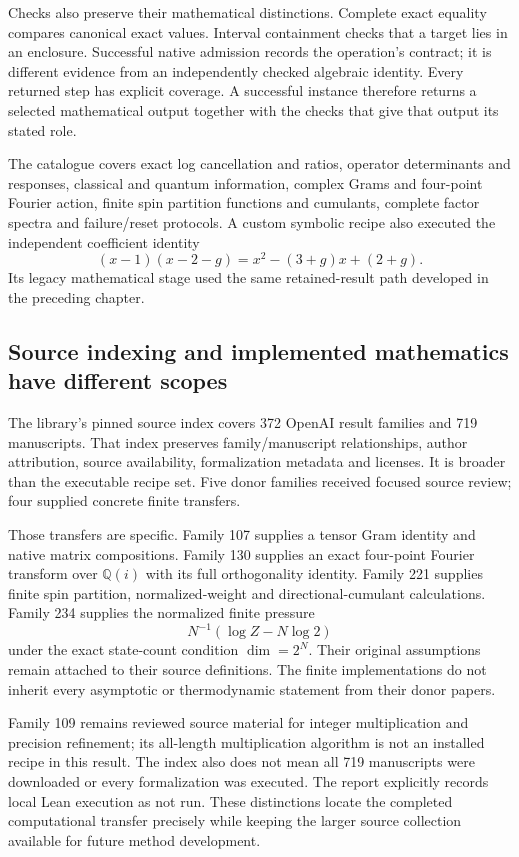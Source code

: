 Checks also preserve their mathematical distinctions. Complete exact equality compares canonical exact values. Interval containment checks that a target lies in an enclosure. Successful native admission records the operation's contract; it is different evidence from an independently checked algebraic identity. Every returned step has explicit coverage. A successful instance therefore returns a selected mathematical output together with the checks that give that output its stated role.

The catalogue covers exact log cancellation and ratios, operator determinants and responses, classical and quantum information, complex Grams and four-point Fourier action, finite spin partition functions and cumulants, complete factor spectra and failure/reset protocols. A custom symbolic recipe also executed the independent coefficient identity
\[
 (x-1)(x-2-g)
 =x^2-(3+g)x+(2+g).
\]
Its legacy mathematical stage used the same retained-result path developed in the preceding chapter.

\subsection{Source indexing and implemented mathematics have different scopes}
\label{v3-runtime-donors}

The library's pinned source index covers 372 OpenAI result families and 719 manuscripts. That index preserves family/manuscript relationships, author attribution, source availability, formalization metadata and licenses. It is broader than the executable recipe set. Five donor families received focused source review; four supplied concrete finite transfers.

Those transfers are specific. Family 107 supplies a tensor Gram identity and native matrix compositions. Family 130 supplies an exact four-point Fourier transform over $\mathbb Q(i)$ with its full orthogonality identity. Family 221 supplies finite spin partition, normalized-weight and directional-cumulant calculations. Family 234 supplies the normalized finite pressure
\[
 N^{-1}(\log Z-N\log2)
\]
under the exact state-count condition $\dim=2^N$. Their original assumptions remain attached to their source definitions. The finite implementations do not inherit every asymptotic or thermodynamic statement from their donor papers.

Family 109 remains reviewed source material for integer multiplication and precision refinement; its all-length multiplication algorithm is not an installed recipe in this result. The index also does not mean all 719 manuscripts were downloaded or every formalization was executed. The report explicitly records local Lean execution as not run. These distinctions locate the completed computational transfer precisely while keeping the larger source collection available for future method development.

